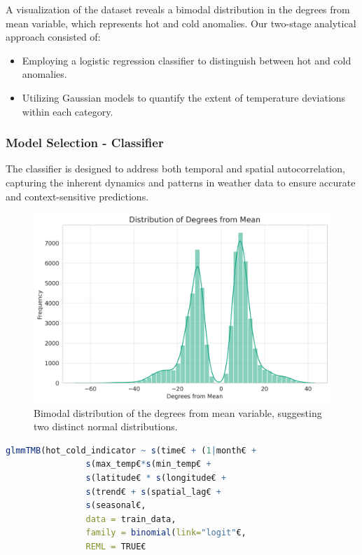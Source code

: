 \documentclass[12pt, twoside,hidelinks]{article}
\theoremstyle{definition}
\numberwithin{equation}{section}
\begin{document}
A visualization of the dataset reveals a bimodal distribution in the degrees from mean variable, which represents hot and cold anomalies. Our two-stage analytical approach consisted of:
\begin{itemize}
\item Employing a logistic regression classifier to distinguish between hot and cold anomalies.
\item Utilizing Gaussian models to quantify the extent of temperature deviations within each category.
\end{itemize}

\subsubsection{Model Selection - Classifier}

The classifier is designed to address both temporal and spatial autocorrelation, capturing the inherent dynamics and patterns in weather data to ensure accurate and context-sensitive predictions.

\begin{figure}[H]
\centering
\includegraphics[width=\textwidth]{visuals/temperature_model_anomalies/degr_from_mean.png}
\caption{Bimodal distribution of the degrees from mean variable, suggesting two distinct normal distributions.}
\label{fig:deg_from_mean_dist}
\end{figure}

\begin{lstlisting}[language=R]
glmmTMB(hot_cold_indicator ~ s(time€ + (1|month€ +
                s(max_temp€*s(min_temp€ +
                s(latitude€ * s(longitude€ +
                s(trend€ + s(spatial_lag€ + 
                s(seasonal€,
                data = train_data,
                family = binomial(link="logit"€,
                REML = TRUE€
\end{lstlisting}
\end{document}
